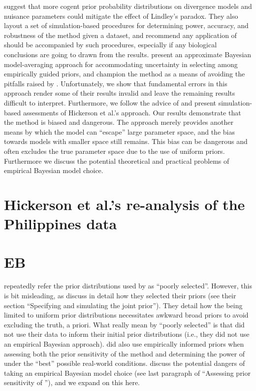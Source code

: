 \documentclass[letterpaper,12pt]{article}
\begin{document}
\begin{linenumbers}
\citet{Oaks2012} suggest that more cogent prior probability distributions on
divergence models and nuisance parameters could mitigate the effect of
Lindley's paradox.
They also layout a set of simulation-based procedures for determining power,
accuracy, and robustness of the method given a dataset, and recommend any
application of \msb should be accompanied by such procedures, especially
if any biological conclusions are going to drawn from the results.
\citet{Hickerson2013} present an approximate Bayesian model-averaging approach
for accommodating uncertainty in selecting among empirically guided priors, and
champion the method as a means of avoiding the pitfalls raised by
\citet{Oaks2012}.
Unfortunately, we show that fundamental errors in this approach render some of
their results invalid and leave the remaining results difficult to interpret.
Furthermore, we follow the advice of \citet{Oaks2012} and present
simulation-based assessments of Hickerson et al.'s \citeyear{Hickerson2013}
approach.
Our results demonstrate that the method is biased and dangerous.
The approach merely provides another means by which the model can ``escape''
large parameter space, and the bias towards models with smaller space still
remains.
This bias can be dangerous and often excludes the true parameter space due to
the use of uniform priors.
Furthermore we discuss the potential theoretical and practical problems of
empirical Bayesian model choice.




\section*{Hickerson et al.'s re-analysis of the Philippines data}




\section*{EB}
\citet{Hickerson2013} repeatedly refer the prior distributions used by
\citet{Oaks2012} as ``poorly selected''.
However, this is bit misleading, as \citet{Oaks2012} discuss in detail how they
selected their priors (see their section ``Specifying and simulating the joint
prior'').
They detail how the being limited to uniform prior distributions necessitates
awkward broad priors to avoid excluding the truth, a priori.
What \citet{Hickerson2013} really mean by ``poorly selected'' is that
\citet{Oaks2012} did not use their data to inform their initial prior
distributions (i.e., they did not use an empirical Bayesian approach).
\citet{Oaks2012} did also use empirically informed priors when assessing
both the prior sensitivity of the method and determining the power of \msb
under the ``best'' possible real-world conditions.
\citet{Oaks2012} discuss the potential dangers of taking an empirical Bayesian
model choice (see last paragraph of ``Assessing prior sensitivity of \msb''),
and we expand on this here.


\end{linenumbers}
\end{document}
